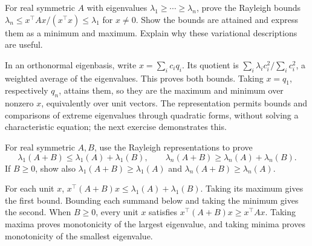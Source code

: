 \begin{problem}\label{ex:12:ineq-ma-39}
For real symmetric \(A\) with eigenvalues \(\lambda_1\geqslant\cdots\geqslant\lambda_n\),
prove the Rayleigh bounds
\(\lambda_n\leqslant x^\top Ax/(x^\top x)\leqslant\lambda_1\) for \(x\ne0\).
Show the bounds are attained and express them as a minimum and maximum.
Explain why these variational descriptions are useful.
\end{problem}
\begin{solution}
In an orthonormal eigenbasis, write \(x=\sum_i c_iq_i\). Its quotient is
\(\sum_i\lambda_i c_i^2/\sum_i c_i^2\), a weighted average of the
eigenvalues. This proves both bounds. Taking \(x=q_1\), respectively
\(q_n\), attains them, so they are the maximum and minimum over nonzero
\(x\), equivalently over unit vectors. The representation permits bounds
and comparisons of extreme eigenvalues through quadratic forms, without
solving a characteristic equation; the next exercise demonstrates this.
\end{solution}

\begin{problem}\label{ex:12:ineq-ma-40}
For real symmetric \(A,B\), use the Rayleigh representations to prove
\[
\lambda_1(A+B)\leqslant\lambda_1(A)+\lambda_1(B),\qquad
\lambda_n(A+B)\geqslant\lambda_n(A)+\lambda_n(B).
\]
If \(B\geqslant0\), show also
\(\lambda_1(A+B)\geqslant\lambda_1(A)\) and
\(\lambda_n(A+B)\geqslant\lambda_n(A)\).
\end{problem}
\begin{solution}
For each unit \(x\),
\(x^\top(A+B)x\leqslant\lambda_1(A)+\lambda_1(B)\).
Taking its maximum gives the first bound. Bounding each summand below
and taking the minimum gives the second.
When \(B\geqslant0\), every unit \(x\) satisfies
\(x^\top(A+B)x\geqslant x^\top Ax\). Taking maxima proves monotonicity
of the largest eigenvalue, and taking minima proves monotonicity of the
smallest eigenvalue.
\end{solution}


